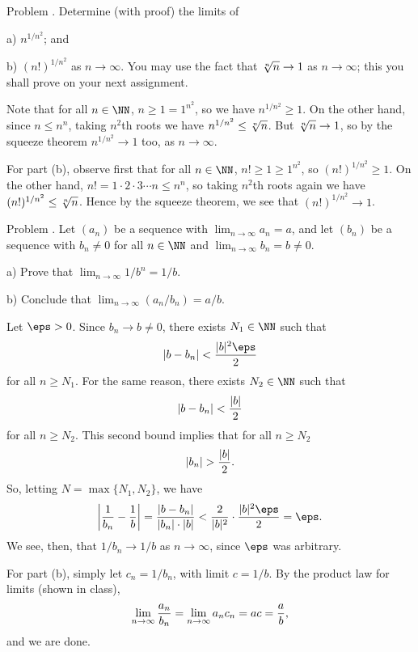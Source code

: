 


\def\To{\Rightarrow}



\bigskip

\proclaim Problem \advthm. Determine (with proof) the limits of
\medskip
\item{a)} $n^{1/n^2}$; and
\smallskip
\item{b)} $(n!)^{1/n^2}$
\medskip
\noindent as $n\to \infty$. You may use the fact that $\root n\of n \to 1$ as $n\to \infty$; this you
shall prove on your next assignment.

\proof Note that for all $n\in \NN$, $n\ge 1 = 1^{n^2}$, so we have $n^{1/n^2} \ge 1$.
On the other hand, since $n\le n^n$, taking $n^2$th roots we have $n^{1/n^2} \le \root n \of n$. But
$\root n\of n\to 1$, so by the squeeze theorem $n^{1/n^2}\to 1$ too, as $n\to\infty$.

For part (b), observe first that for all $n\in \NN$, $n! \ge 1\ge 1^{n^2}$, so $(n!)^{1/n^2}\ge 1$.
On the other hand, $n! = 1\cdot 2\cdot 3\cdots n \le n^n$, so taking $n^2$th roots again we have
$(n!)^{1/n^2} \le \root n \of n$. Hence
by the squeeze theorem, we see that $(n!)^{1/n^2} \to 1$.\slug

\proclaim Problem \advthm. Let $(a_n)$ be a sequence with $\lim_{n\to\infty} a_n = a$,
and let $(b_n)$ be a sequence with $b_n\ne 0$ for all $n\in \NN$ and $\lim_{n\to\infty} b_n = b\ne 0$.
\medskip
\item{a)} Prove that $\lim_{n\to\infty} 1/b^n = 1/b$.
\smallskip
\item{b)} Conclude that $\lim_{n\to\infty} (a_n/b_n) = a/b$.
\medskip

\proof Let $\eps > 0$. Since $b_n\to b\ne 0$, there exists $N_1\in \NN$ such that
$$|b-b_n|<{|b|^2\eps\over 2}$$
for all $n\ge N_1$. For the same reason, there exists $N_2\in \NN$ such that
$$|b-b_n| < {|b|\over 2}$$
for all $n\ge N_2$. This second bound implies that for all $n\ge N_2$
$$|b_n| > {|b|\over 2}.$$
So, letting $N = \max\{N_1, N_2\}$, we have
$$\biggl| {1\over b_n} - {1\over b}\biggr|
= {|b-b_n|\over |b_n|\cdot |b|} < {2\over |b|^2}\cdot {|b|^2\eps\over 2} = \eps.$$
We see, then, that $1/b_n\to 1/b$ as $n\to \infty$, since $\eps$ was arbitrary.

For part (b), simply let $c_n = 1/b_n$, with limit $c = 1/b$. By the product law for limits (shown in class),
$$\lim_{n\to\infty} {a_n\over b_n} = \lim_{n\to\infty} a_nc_n = ac = {a\over b},$$
and we are done.
\slug

